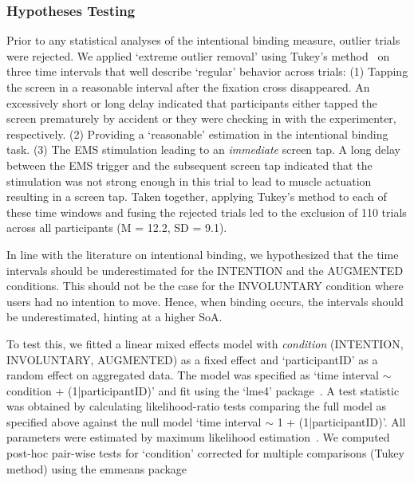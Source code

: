 \subsubsection{Hypotheses Testing}
Prior to any statistical analyses of the intentional binding measure, outlier trials were rejected. We applied `extreme outlier removal' using Tukey's method~\cite{Tukey1949-sl} on three time intervals that well describe `regular' behavior across trials: (1) Tapping the screen in a reasonable interval after the fixation cross disappeared. An excessively short or long delay indicated that participants either tapped the screen prematurely by accident or they were checking in with the experimenter, respectively. (2) Providing a `reasonable' estimation in the intentional binding task. (3) The EMS stimulation leading to an \textit{immediate} screen tap. A long delay between the EMS trigger and the subsequent screen tap indicated that the stimulation was not strong enough in this trial to lead to muscle actuation resulting in a screen tap. Taken together, applying Tukey's method to each of these time windows and fusing the rejected trials led to the exclusion of 110 trials across all participants (M = 12.2, SD = 9.1). %

In line with the literature on intentional binding, we hypothesized that the time intervals should be underestimated for the INTENTION and the AUGMENTED conditions. This should not be the case for the INVOLUNTARY condition where users had no intention to move. Hence, when binding occurs, the intervals should be underestimated, hinting at a higher SoA. 

To test this, we fitted a linear mixed effects model with \textit{condition} (INTENTION, INVOLUNTARY, AUGMENTED) as a fixed effect and `participantID' as a random effect on aggregated data. The model was specified as `time interval $\sim$ condition + (1|participantID)' and fit using the `lme4' package~\cite{Bates2015-bh}. A test statistic was obtained by calculating likelihood-ratio tests comparing the full model as specified above against the null model `time interval $\sim$ 1 + (1|participantID)'. All parameters were estimated by maximum likelihood estimation~\cite{Pinheiro2006-bk}. We computed post-hoc pair-wise tests for `condition' corrected for multiple comparisons (Tukey method) using the emmeans package~\cite{Lenth2020-xk}


